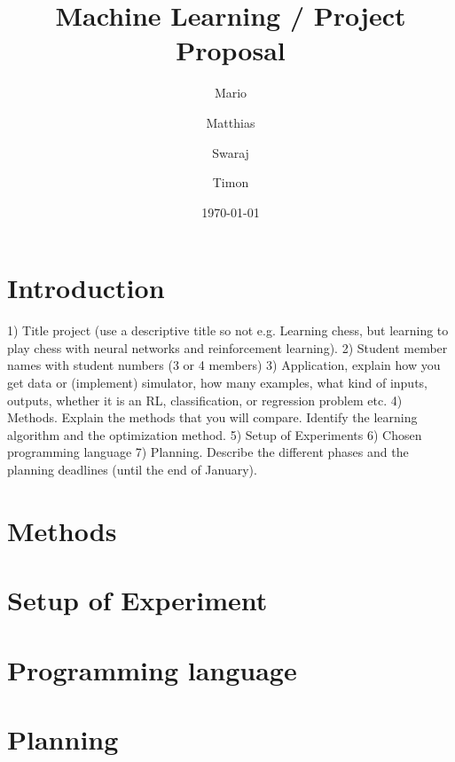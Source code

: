 \documentclass[dvips,12pt]{article}
\title{Machine Learning / Project Proposal}
\author{Mario \and Matthias \and Swaraj \and Timon}
\date{\today}
\begin{document}
\maketitle

\section{Introduction}
1) Title project (use a descriptive title so not e.g. Learning chess, but learning to play chess with neural networks and reinforcement learning).
2) Student member names with student numbers (3 or 4 members)
3) Application, explain how you get data or (implement) simulator, how many examples, what kind
of inputs, outputs, whether it is an RL, classification, or regression problem etc.
4) Methods. Explain the methods that you will compare. Identify the learning
algorithm and the optimization method.
5) Setup of Experiments
6) Chosen programming language
7) Planning. Describe the different phases and the planning deadlines (until the end of January).

\section{Methods}
    
\section{Setup of Experiment}
    
\section{Programming language}
    
\section{Planning}
    
\begin{thebibliography}{99}

\end{thebibliography}
\end{document}
